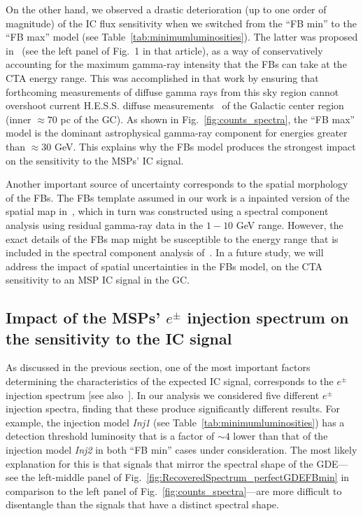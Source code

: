 \documentclass[doublespace,nopageskip]{VTthesis} %
\begin{document}
On the other hand, we observed a drastic deterioration (up to one order of magnitude) of the IC flux  sensitivity when we switched from the ``FB min'' to the ``FB max'' model (see Table~\ref{tab:minimumluminosities}). 
The latter was proposed in~\cite{2021PhRvD.103b3011R} (see the left panel of Fig.~1 in that article), as a way of conservatively accounting for the maximum gamma-ray intensity that the FBs can take at the CTA energy range. This was accomplished in that work by ensuring that forthcoming measurements of diffuse gamma rays from this sky region cannot overshoot current H.E.S.S. diffuse measurements~\citep{2016Natur.531..476H} of the Galactic center region (inner $\approx 70$ pc of the GC). As shown in Fig.~\ref{fig:counts_spectra}, the ``FB max'' model is the dominant astrophysical gamma-ray component for energies greater than $\approx 30$ GeV. This explains why the FBs model produces the strongest impact on the sensitivity to the MSPs' IC signal.

Another important source of uncertainty corresponds to the spatial morphology of the FBs. The FBs template assumed in our work is a inpainted version of the spatial map in~\cite{2017ApJ...840...43A}, which in turn was constructed using a spectral component analysis using residual gamma-ray data in the $1-10$ GeV range. However, the exact details of the FBs map might be susceptible to the energy range that is included in the spectral component analysis of~\cite{2017ApJ...840...43A}. In a future study, we will address the impact of spatial uncertainties in the FBs model, on the CTA sensitivity to an MSP IC signal in the GC.  

\subsection{Impact of the MSPs' $e^\pm$ injection spectrum on the sensitivity to the IC signal}

As discussed in the previous section, one of the most important factors determining the characteristics of the expected IC signal, corresponds to the $e^\pm$ injection spectrum [see also~\citep{2019PhRvD..99l3020S}]. In our analysis we  considered five different $e^\pm$ injection spectra, finding that these produce significantly different results. For example, the injection model \textit{Inj1} (see Table~\ref{tab:minimumluminosities}) has a detection threshold luminosity that is a factor of $\sim 4$
lower than that of the injection model \textit{Inj2} in both ``FB min'' cases under consideration. The most likely explanation for this is that signals that mirror the spectral shape of the GDE---see the left-middle panel of Fig.~\ref{fig:RecoveredSpectrum_perfectGDEFBmin} in comparison to the left panel of Fig.~\ref{fig:counts_spectra}---are more difficult
to disentangle than the signals that have a distinct spectral shape.
\end{document}
